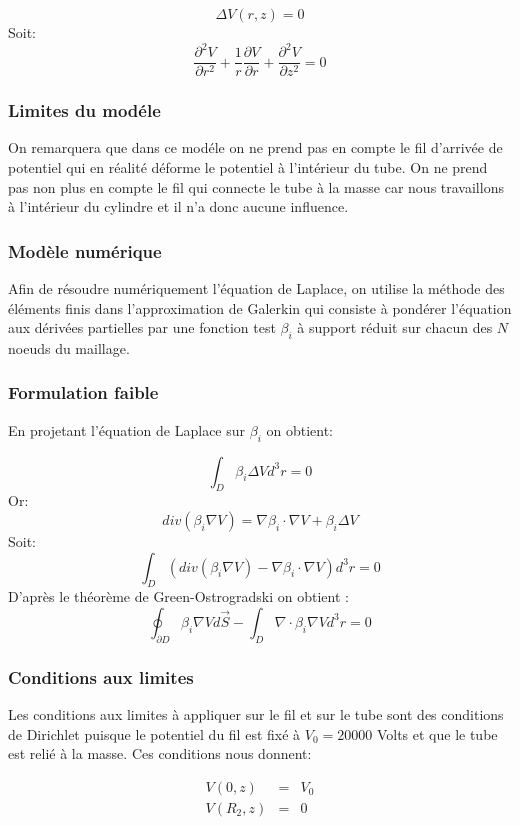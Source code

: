 \documentclass[a4paper,12pt]{article}
\begin{document}
\[
\Delta V(r,z)=0
\]
Soit:
\[
\frac{\partial^2 V}{\partial r^2}+\frac{1}{r}\frac{\partial V}{ \partial r}+\frac{\partial^2 V}{\partial z^2}=0
\]

\subsubsection{Limites du modéle}
On remarquera que dans ce modéle on ne prend pas en compte le fil d'arrivée de potentiel qui en réalité déforme le potentiel à l'intérieur du tube. On ne prend pas non plus en compte le fil qui connecte le tube à la masse car nous travaillons à l'intérieur du cylindre et il n'a donc aucune influence.

\subsubsection{Modèle numérique}
Afin de résoudre numériquement l'équation de Laplace, on utilise la méthode des éléments finis dans l'approximation de Galerkin qui consiste à pondérer l'équation aux dérivées partielles par une fonction test $\beta_i$ à support réduit sur chacun des $N$ noeuds du maillage.

\subsubsection{Formulation faible}
En projetant l'équation de Laplace sur $\beta_i$ on obtient:

\[
\int_{D} \beta_i \Delta V d^3r = 0
\]
Or:
\[
div(\beta_i \nabla V) = \nabla \beta_i \cdot \nabla V + \beta_i \Delta V
\]
Soit:
\[
\int_{D} \left( div(\beta_i \nabla V) - \nabla\beta_i \cdot \nabla V \right) d^3r = 0
\]
D'après le théorème de Green-Ostrogradski on obtient :
\[
\oint_{\partial D} \beta_i \nabla V d\vec{S} - \int_{D} \nabla \cdot \beta_i \nabla V d^3 r = 0
\]

\subsubsection{Conditions aux limites}
Les conditions aux limites à appliquer sur le fil et sur le tube sont des conditions de Dirichlet puisque le potentiel du fil est fixé à $V_0=20000$ Volts et que le tube est relié à la masse. Ces conditions nous donnent:



\begin{eqnarray}
V(0,z) &=& V_0 \\
V(R_2,z) &=& 0
\end{eqnarray}
\end{document}
